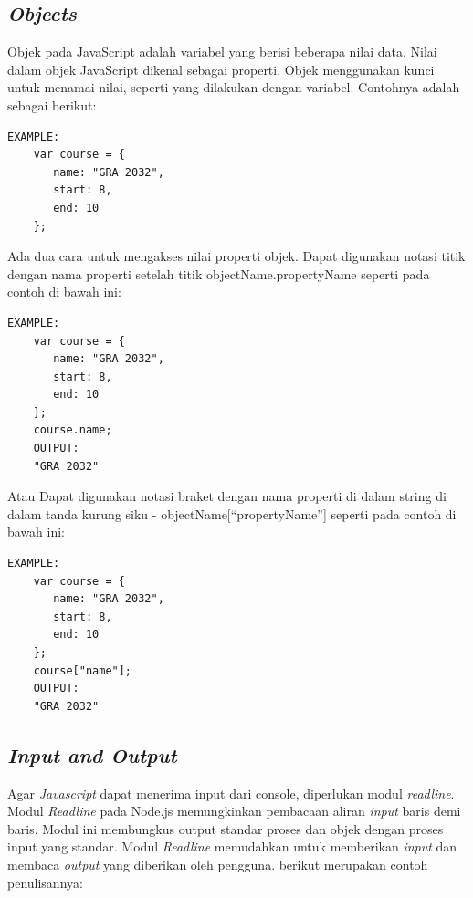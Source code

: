 \subsection{\textit{Objects}}
\label{sec: Objects}
Objek pada JavaScript adalah variabel yang berisi beberapa nilai data. Nilai dalam objek JavaScript dikenal sebagai properti\cite{javascriptlearn}. Objek menggunakan kunci untuk menamai nilai, seperti yang dilakukan dengan variabel. Contohnya adalah sebagai berikut: 
    \begin{lstlisting}[basicstyle=\ttfamily, frame=single,
    columns=fullflexible, breaklines=true, numbers=none]
    EXAMPLE:
    var course = {
       name: "GRA 2032",
       start: 8,
       end: 10
    };
    \end{lstlisting}
    Ada dua cara untuk mengakses nilai properti objek. Dapat digunakan notasi titik dengan nama properti setelah titik objectName.propertyName seperti pada contoh di bawah ini:
    \begin{lstlisting}[basicstyle=\ttfamily, frame=single,
    columns=fullflexible, breaklines=true, numbers=none]
    EXAMPLE:
    var course = {
       name: "GRA 2032",
       start: 8,
       end: 10
    };
    course.name;
    OUTPUT:
    "GRA 2032"
    \end{lstlisting}
    Atau Dapat digunakan notasi braket dengan nama properti di dalam string di dalam tanda kurung siku - objectName[“propertyName”] seperti pada contoh di bawah ini:
    \begin{lstlisting}[basicstyle=\ttfamily, frame=single,
    columns=fullflexible, breaklines=true, numbers=none]
    EXAMPLE:
    var course = {
       name: "GRA 2032",
       start: 8,
       end: 10
    };
    course["name"];
    OUTPUT:
    "GRA 2032"
    \end{lstlisting}
    
\subsection{\textit{Input and Output}}
\label{sec: Input and Output}

Agar \textit{Javascript} dapat menerima input dari console, diperlukan modul \textit{readline}. Modul \textit{Readline} pada Node.js memungkinkan pembacaan aliran \textit{input} baris demi baris. Modul ini membungkus output standar proses dan objek dengan proses input yang standar. Modul \textit{Readline} memudahkan untuk memberikan \textit{input} dan membaca \textit{output} yang diberikan oleh pengguna. berikut merupakan contoh penulisannya: 

